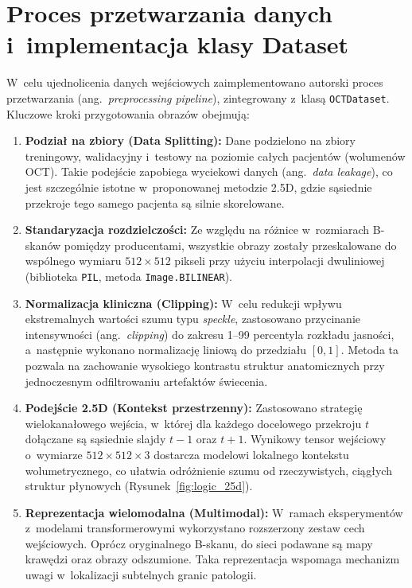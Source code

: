 \documentclass[12pt,a4paper,oneside]{report}
\begin{document}
\section{Proces przetwarzania danych i~implementacja klasy Dataset}

W~celu ujednolicenia danych wejściowych zaimplementowano autorski proces przetwarzania (ang.~\textit{preprocessing pipeline}), zintegrowany z~klasą \texttt{OCTDataset}. Kluczowe kroki przygotowania obrazów obejmują:

\begin{enumerate}
 \item \textbf{Podział na zbiory (Data Splitting):} Dane podzielono na zbiory treningowy, walidacyjny i~testowy na poziomie całych pacjentów (wolumenów OCT). Takie podejście zapobiega wyciekowi danych (ang.~\textit{data leakage}), co jest szczególnie istotne w~proponowanej metodzie 2.5D, gdzie sąsiednie przekroje tego samego pacjenta są silnie skorelowane.
 \item \textbf{Standaryzacja rozdzielczości:} Ze względu na różnice w~rozmiarach B-skanów pomiędzy producentami, wszystkie obrazy zostały przeskalowane do wspólnego wymiaru $512 \times 512$ pikseli przy użyciu interpolacji dwuliniowej (biblioteka \texttt{PIL}, metoda \texttt{Image.BILINEAR}).
 \item \textbf{Normalizacja kliniczna (Clipping):} W~celu redukcji wpływu ekstremalnych wartości szumu typu \textit{speckle}, zastosowano przycinanie intensywności (ang.~\textit{clipping}) do zakresu 1--99 percentyla rozkładu jasności, a~następnie wykonano normalizację liniową do przedziału $[0, 1]$. Metoda ta pozwala na zachowanie wysokiego kontrastu struktur anatomicznych przy jednoczesnym odfiltrowaniu artefaktów świecenia.
 \item \textbf{Podejście 2.5D (Kontekst przestrzenny):} Zastosowano strategię wielokanałowego wejścia, w~której dla każdego docelowego przekroju $t$ dołączane są sąsiednie slajdy $t-1$ oraz $t+1$. Wynikowy tensor wejściowy o~wymiarze $512 \times 512 \times 3$ dostarcza modelowi lokalnego kontekstu wolumetrycznego, co ułatwia odróżnienie szumu od rzeczywistych, ciągłych struktur płynowych (Rysunek~\ref{fig:logic_25d}).
 \item \textbf{Reprezentacja wielomodalna (Multimodal):} W~ramach eksperymentów z~modelami transformerowymi wykorzystano rozszerzony zestaw cech wejściowych. Oprócz oryginalnego B-skanu, do sieci podawane są mapy krawędzi oraz obrazy odszumione. Taka reprezentacja wspomaga mechanizm uwagi w~lokalizacji subtelnych granic patologii.
\end{enumerate}
\end{document}
